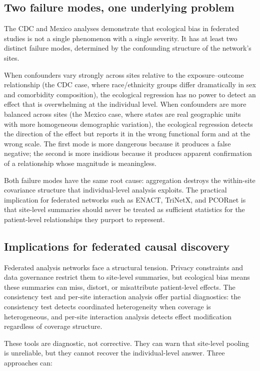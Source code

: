 \documentclass{article}
\begin{document}
\subsection{Two failure modes, one underlying problem}

The CDC and Mexico analyses demonstrate that ecological bias in federated
studies is not a single phenomenon with a single severity.  It has at least
two distinct failure modes, determined by the confounding structure of the
network's sites.

When confounders vary strongly across sites relative to the
exposure--outcome relationship (the CDC case, where race/ethnicity groups
differ dramatically in sex and comorbidity composition), the ecological
regression has no power to detect an effect that is overwhelming at the
individual level.  When confounders are more balanced across sites (the
Mexico case, where states are real geographic units with more homogeneous
demographic variation), the ecological regression detects the direction of
the effect but reports it in the wrong functional form and at the wrong
scale.  The first mode is more dangerous because it produces a false
negative; the second is more insidious because it produces apparent
confirmation of a relationship whose magnitude is meaningless.

Both failure modes have the same root cause: aggregation destroys the
within-site covariance structure that individual-level analysis exploits.
The practical implication for federated networks such as ENACT, TriNetX,
and PCORnet is that site-level summaries should never be treated as
sufficient statistics for the patient-level relationships they purport to
represent.

\subsection{Implications for federated causal discovery}

Federated analysis networks face a structural tension.  Privacy
constraints and data governance restrict them to site-level summaries, but
ecological bias means these summaries can miss, distort, or misattribute
patient-level effects.  The consistency test and per-site interaction
analysis offer partial diagnostics: the consistency test detects
coordinated heterogeneity when coverage is heterogeneous, and per-site
interaction analysis detects effect modification regardless of coverage
structure.

These tools are diagnostic, not corrective.  They can warn that
site-level pooling is unreliable, but they cannot recover the
individual-level answer.  Three approaches can:
\end{document}
